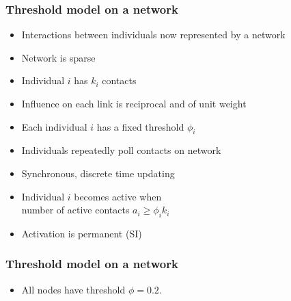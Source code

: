 \begin{frame}
  \frametitle{Threshold model on a network}

  \begin{itemize}
  \item<1-> Interactions between individuals 
    now represented by a network
  \item<2-> Network is \alert{sparse}
  \item<3-> Individual $i$ has $k_i$ contacts
  \item<4-> Influence on each link is \alert{reciprocal} and of \alert{unit weight}
  \item<5-> Each individual $i$ has a fixed threshold $\phi_i$
  \item<6-> Individuals repeatedly poll contacts on network
  \item<7-> Synchronous, discrete time updating 
  \item<8-> Individual $i$ becomes active when\\
    number of active contacts $a_i \ge \phi_i k_i$
  \item<9-> Activation is permanent (SI)
  \end{itemize}

\end{frame}



\begin{frame}
  \frametitle{Threshold model on a network}

  \begin{overprint}
    \setlength\fboxsep{0pt}
    \setlength\fboxrule{0.5pt}
    \setlength\fboxsep{0pt}
    \setlength\fboxrule{0.5pt}
    \setlength\fboxsep{0pt}
    \setlength\fboxrule{0.5pt}
  \end{overprint}

  \begin{itemize}
  \item All nodes have threshold $\phi=0.2$.
  \end{itemize}



\end{frame}


